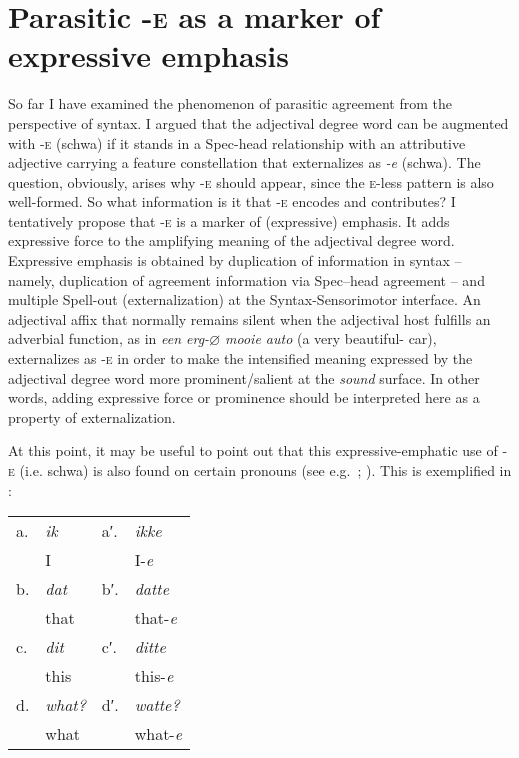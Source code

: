 \documentclass[output=paper]{langsci/langscibook}
\begin{document}
\section{Parasitic \textsc{-e} as a marker of expressive
emphasis}\label{sec:key:18.8}

So far I have examined the phenomenon of parasitic agreement from the
perspective of syntax. I argued that the adjectival degree word can be
augmented with \textsc{-e} (schwa) if it stands in a Spec-head relationship
with an attributive adjective carrying a feature constellation that
externalizes as \emph{-e} (schwa). The question, obviously, arises why
\textsc{-e} should appear, since the \textsc{e-}less pattern is also
well-formed. So what information is it that \textsc{-e} encodes and
contributes? I tentatively propose that \textsc{-e} is a marker of (expressive)
emphasis. It adds expressive force to the amplifying meaning of the adjectival
degree word. Expressive emphasis is obtained by duplication of information in
syntax – namely, duplication of agreement information via Spec--head agreement –
and multiple Spell-out (externalization) at the Syntax-Sensorimotor interface.
An adjectival affix that normally remains silent when the adjectival host
fulfills an adverbial function, as in \emph{een erg-${\varnothing}$ mooie auto}
(a very beautiful-\Agr{} car), externalizes as \textsc{-e} in order to make the
intensified meaning expressed by the adjectival degree word more
prominent/salient at the \emph{sound} surface. In other words, adding
expressive force or prominence should be interpreted here as a property of
externalization.

At this point, it may be useful to point out that this expressive-emphatic use
of \textsc{-e} (i.e. schwa) is also found on certain  pronouns (see
e.g.\ \citealt[237--238]{HaeserynEtAl1997}; \citealt{Hoeksema2000,Zwart2001}).
This is exemplified in :

\begin{exe}
    \ex\label{ex:key:18.55}
    \begin{tabularx}{.40\textwidth}[t]{llll}
        a. & \emph{ik} & aʹ. & \emph{ikke}\\
           & I & & I-\emph{e}\\
        b. & \emph{dat} & bʹ. & \emph{datte}\\
           & that & & that-\emph{e}\\
        c. & \emph{dit} & cʹ. & \emph{ditte}\\
           & this & & this-\emph{e}\\
        d. & \emph{what?} & dʹ. & \emph{watte?}\\
           & what & & what-\emph{e}\\
    \end{tabularx}
\end{exe}
\end{document}
